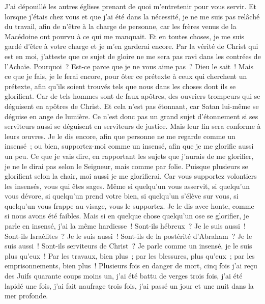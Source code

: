 \begin{multicols}{2}
J'ai dépouillé les autres églises prenant de quoi m'entretenir pour vous servir. Et lorsque j'étais chez vous et que j'ai été dans la nécessité, je ne me suis pas relâché du travail, afin de n'être à la charge de personne,
car les frères venus de la Macédoine ont pourvu à ce qui me manquait. Et en toutes choses, je me suis gardé d'être à votre charge et je m'en garderai encore.
Par la vérité de Christ qui est en moi, j'atteste que ce sujet de gloire ne me sera pas ravi dans les contrées de l'Achaïe.
Pourquoi~? Est-ce parce que je ne vous aime pas~? Dieu le sait~!
Mais ce que je fais, je le ferai encore, pour ôter ce prétexte à ceux qui cherchent un prétexte, afin qu'ils soient trouvés tels que nous dans les choses dont ils se glorifient.
Car de tels hommes sont de faux apôtres, des ouvriers trompeurs qui se déguisent en apôtres de Christ.
Et cela n'est pas étonnant, car Satan lui-même se déguise en ange de lumière.
Ce n'est donc pas un grand sujet d'étonnement si ses serviteurs aussi se déguisent en serviteurs de justice. Mais leur fin sera conforme à leurs œuvres.
Je le dis encore, afin que personne ne me regarde comme un insensé~; ou bien, supportez-moi comme un insensé, afin que je me glorifie aussi un peu.
Ce que je vais dire, en rapportant les sujets que j'aurais de me glorifier, je ne le dirai pas selon le Seigneur, mais comme par folie.
Puisque plusieurs se glorifient selon la chair, moi aussi je me glorifierai.
Car vous supportez volontiers les insensés, vous qui êtes sages.
Même si quelqu'un vous asservit, si quelqu'un vous dévore, si quelqu'un prend votre bien, si quelqu'un s'élève sur vous, si quelqu'un vous frappe au visage, vous le supportez.
Je le dis avec honte, comme si nous avons été faibles. Mais si en quelque chose quelqu'un ose se glorifier, je parle en insensé, j'ai la même hardiesse~!
Sont-ils hébreux~? Je le suis aussi~! Sont-ils Israélites~? Je le suis aussi~! Sont-ils de la postérité d'Abraham~? Je le suis aussi~!
Sont-ils serviteurs de Christ~? Je parle comme un insensé, je le suis plus qu'eux~! Par les travaux, bien plus~; par les blessures, plus qu'eux~; par les emprisonnements, bien plus~! Plusieurs fois en danger de mort,
cinq fois j'ai reçu des Juifs quarante coups moins un,
j'ai été battu de verges trois fois, j'ai été lapidé une fois, j'ai fait naufrage trois fois, j'ai passé un jour et une nuit dans la mer profonde.

\end{multicols}

